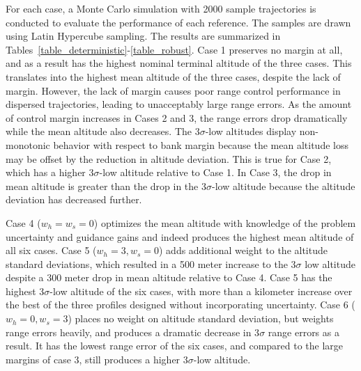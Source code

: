\documentclass[journal ]{new-aiaa}
\begin{document}

For each case, a Monte Carlo simulation with 2000 sample trajectories is conducted to evaluate the performance of each reference. The samples are drawn using Latin Hypercube sampling. The results are summarized in Tables~\ref{table_deterministic}-\ref{table_robust}. Case 1 preserves no margin at all, and as a result has the highest nominal terminal altitude of the three cases. This translates into the highest mean altitude of the three cases, despite the lack of margin. However, the lack of margin causes poor range control performance in dispersed trajectories, leading to unacceptably large range errors. As the amount of control margin increases in Cases 2 and 3, the range errors drop dramatically while the mean altitude also decreases. The 3$\sigma$-low altitudes display non-monotonic behavior with respect to bank margin because the mean altitude loss may be offset by the reduction in altitude deviation. This is true for Case 2, which has a higher 3$\sigma$-low altitude relative to Case 1. In Case 3, the drop in mean altitude is greater than the drop in the 3$\sigma$-low altitude because the altitude deviation has decreased further. 

Case 4 ($ w_h=w_s=0 $) optimizes the mean altitude with knowledge of the problem uncertainty and guidance gains and indeed produces the highest mean altitude of all six cases. Case 5 ($ w_h=3,w_s=0 $) adds additional weight to the altitude standard deviations, which resulted in a 500 meter increase to the 3$\sigma$ low altitude despite a 300 meter drop in mean altitude relative to Case 4. Case 5 has the highest 3$\sigma$-low altitude of the six cases, with more than a kilometer increase over the best of the three profiles designed without incorporating uncertainty. Case 6 ($ w_h=0, w_s=3$) places no weight on altitude standard deviation, but weights range errors heavily, and produces a dramatic decrease in 3$\sigma$ range errors as a result. It has the lowest range error of the six cases, and compared to the large margins of case 3, still produces a higher 3$\sigma$-low altitude.
\end{document}
